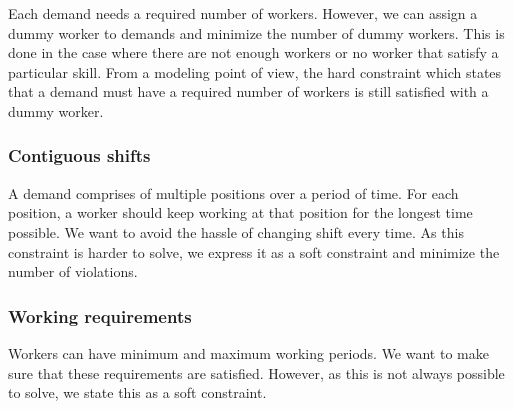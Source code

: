 \documentclass[../thesis.tex]{subfiles}
\begin{document}
Each demand needs a required number of workers. However, we can assign a dummy worker to demands 
and minimize the number of dummy workers. This is done in the case where there are not enough workers
or no worker that satisfy a particular skill. From a modeling point of view, the hard constraint which states that 
a demand must have a required number of workers is still satisfied with a dummy worker.

\subsubsection{Contiguous shifts}

A demand comprises of multiple positions over a period of time. 
For each position, a worker should keep working at that position for the longest time possible. 
We want to avoid the hassle of changing shift every time. 
As this constraint is harder to solve, we express it as a soft constraint and minimize the number of 
violations.

\subsubsection{Working requirements}

Workers can have minimum and maximum working periods. We want to make sure 
that these requirements are satisfied. However, as this is not always possible to solve, we 
state this as a soft constraint.
\end{document}
